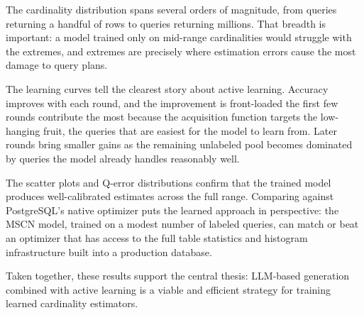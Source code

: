 The cardinality distribution spans several orders of magnitude, from queries returning a handful of rows to queries returning millions. That breadth is important: a model trained only on mid-range cardinalities would struggle with the extremes, and extremes are precisely where estimation errors cause the most damage to query plans.

The learning curves tell the clearest story about active learning. Accuracy improves with each round, and the improvement is front-loaded the first few rounds contribute the most because the acquisition function targets the low-hanging fruit, the queries that are easiest for the model to learn from. Later rounds bring smaller gains as the remaining unlabeled pool becomes dominated by queries the model already handles reasonably well.

The scatter plots and Q-error distributions confirm that the trained model produces well-calibrated estimates across the full range. Comparing against PostgreSQL's native optimizer puts the learned approach in perspective: the MSCN model, trained on a modest number of labeled queries, can match or beat an optimizer that has access to the full table statistics and histogram infrastructure built into a production database.

Taken together, these results support the central thesis: LLM-based generation combined with active learning is a viable and efficient strategy for training learned cardinality estimators.
